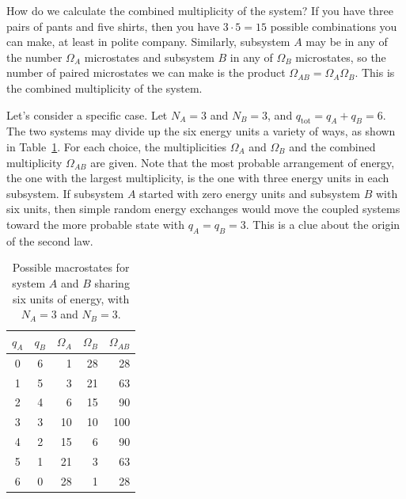 How do we calculate the combined multiplicity of the system?  If you
have three pairs of pants and five shirts, then you have $3\cdot 5=15$
possible combinations you can make, at least in polite company.
Similarly, subsystem $A$ may be in any of the number $\Omega_A$
microstates and subsystem $B$ in any of $\Omega_B$ microstates, so the
number of paired microstates we can make is the product $\Omega_{AB} =
\Omega_A\Omega_B$.  This is the combined multiplicity of the system.

Let's consider a specific case.  Let $N_A=3$ and $N_B=3$, and
$q_\text{tot}=q_A+q_B=6$.  The two systems may divide up the six energy
units a variety of ways, as shown in Table~\ref{table:two_systems}.
For each choice, the multiplicities $\Omega_A$ and $\Omega_B$ and the
combined multiplicity $\Omega_{AB}$ are given.  Note that the most
probable arrangement of energy, the one with the largest multiplicity,
is the one with three energy units in each subsystem.  If subsystem
$A$ started with zero energy units and subsystem $B$ with six units,
then simple random energy exchanges would move the coupled systems
toward the more probable state with $q_A=q_B=3$.  This is a clue about the
origin of the second law.

\begin{table}
\begin{center}
\begin{tabular}{ccrrr}
\hline\hline
$q_A$ & $q_B$ & \qquad $\Omega_A$ & $\Omega_B$ & \qquad $\Omega_{AB}$ \\
\hline
0 & 6 & 1 & 28 & 28 \\
1 & 5 & 3 & 21 & 63 \\
2 & 4 & 6 & 15 & 90 \\
3 & 3 & 10 & 10 & 100 \\
4 & 2 & 15 & 6 & 90 \\
5 & 1 & 21 & 3 & 63 \\
6 & 0 & 28 & 1 & 28 \\
\hline\hline 
\end{tabular}
\caption{Possible macrostates for system $A$ and $B$ sharing six units
  of energy, with $N_A=3$ and $N_B=3$.}
\label{table:two_systems}
\end{center}
\end{table}

